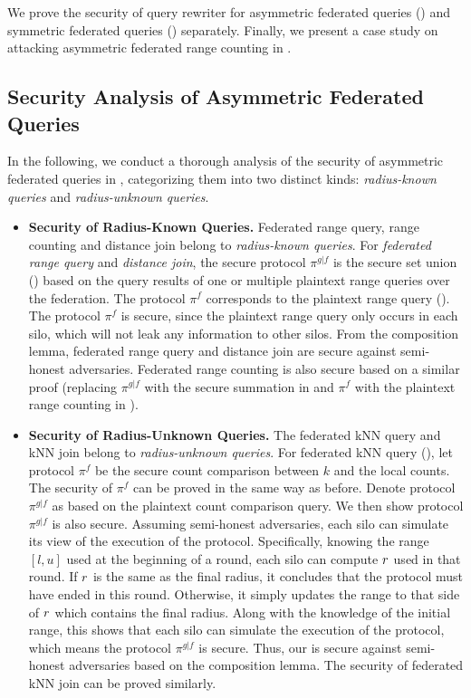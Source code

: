 We prove the security of query rewriter for asymmetric federated queries () and symmetric federated queries () separately.
Finally, we present a case study on attacking asymmetric federated range counting in .

\subsection{Security Analysis of Asymmetric Federated Queries}\label{app:secure-asym}

In the following, we conduct a thorough analysis of the security of asymmetric federated queries in \sysname, categorizing them into two distinct kinds: \textit{radius-known queries} and \textit{radius-unknown queries}. 

\begin{itemize}
    \item \textbf{Security of Radius-Known Queries.} Federated range query, range counting and distance join belong to \textit{radius-known queries}.
    For \textit{federated range query} and \textit{distance join}, the secure protocol $\pi^{g|f}$ is the secure set union () based on the query results of one or multiple plaintext range queries over the federation.
    The protocol $\pi^f$ corresponds to the plaintext range query ().
    The protocol $\pi^f$ is secure, since the plaintext range query only occurs in each silo, which will not leak any information to other silos.
    From the composition lemma, federated range query and distance join are secure against semi-honest adversaries.
    Federated range counting is also secure based on a similar proof (\ie replacing $\pi^{g|f}$ with the secure summation in  and $\pi^f$ with the plaintext range counting in ).
    
    \item \textbf{Security of Radius-Unknown Queries.} The federated kNN query and kNN join belong to \textit{radius-unknown queries}.
    For federated kNN query (), let protocol $\pi^f$ be the secure count comparison between $k$ and the local counts.
    The security of $\pi^f$ can be proved in the same way as before.
    Denote protocol $\pi^{g|f}$ as  based on the plaintext count comparison query.
    We then show protocol $\pi^{g|f}$ is also secure.
    Assuming semi-honest adversaries, each silo can simulate its view of the execution of the protocol.
    Specifically, knowing the range $[l, u]$ used at the beginning of a round, each silo can compute $r$ used in that round.
    If $r$ is the same as the final radius, it concludes that the protocol must have ended in this round.
    Otherwise, it simply updates the range to that side of $r$ which contains the final radius.
    Along with the knowledge of the initial range, this shows that each silo can simulate the execution of the protocol, which means the protocol $\pi^{g|f}$ is secure.
    Thus, our  is secure against semi-honest adversaries based on the composition lemma.
    The security of federated kNN join can be proved similarly.
\end{itemize}

